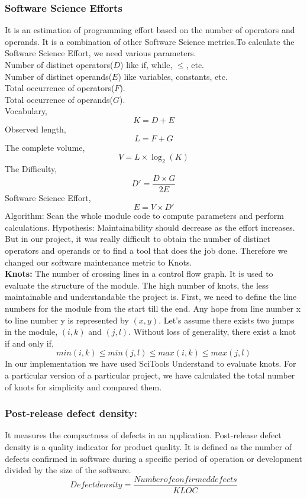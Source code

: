 \documentclass[letterpaper, 12 pt, conference]{ieeetran}  %
\begin{document}
\subsubsection{Software Science Efforts}
It is an estimation of programming effort based on the number of operators and operands. It is a combination of other Software Science metrics.To calculate the Software Science Effort, we need various parameters.\\
Number of distinct operators($D$) like if, while, $\leq$, etc.\\
Number of distinct operands($E$) like variables, constants, etc.\\
Total occurrence of operators($F$).\\
Total occurrence of operands($G$).\\
Vocabulary,\[K = D + E\]
Observed length, \[L = F + G\]
The complete volume, \[V = L \times \log_2(K)\]
The Difficulty, \[D' = \frac{D \times G}{2E}\]
Software Science Effort, \[E = V \times D'\]
Algorithm: Scan the whole module code to compute parameters and perform calculations. Hypothesis: Maintainability should decrease as the effort increases.\\
But in our project, it was really difficult to obtain the number of distinct operators and operands or to find a tool that does the job done. Therefore we changed our software maintenance metric to Knots\cite{woodward1979measure}\cite{frappier1994software}.\\
\textbf{Knots:} The number of crossing lines in a control flow graph. It is used to evaluate the structure of the module. The high number of knots, the less maintainable and understandable the project is\cite{woodward1979measure}\cite{frappier1994software}.
First, we need to define the line numbers for the module from the start till the end. Any hope from line number x to line number y is represented by $(x,y)$. Let’s assume there exists two jumps in the module, $(i,k)$ and $(j,l)$. Without loss of generality, there exist a knot if and only if,
\[min(i,k) \leq min(j,l) \leq max(i,k) \leq max(j,l)\]
In our implementation we have used SciTools Understand to evaluate knots. For a particular version of a particular project, we have calculated the total number of knots for simplicity and compared them\cite{conte1986software}\cite{frappier1994software}.
\\
\subsubsection{Post-release defect density:}
It measures the compactness of defects in an application. Post-release defect density is a quality indicator for product quality. It is defined as the number of defects confirmed in software during a specific period of operation or development divided by the size of the software.
\[Defect density = \frac{Number of confirmed defects}{KLOC}\]
\end{document}
